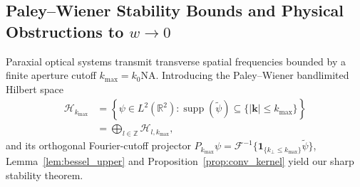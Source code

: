 \documentclass[aps,pra,onecolumn,notitlepage,11pt,tightenlines,nofootinbib,floatfix,longbibliography]{revtex4-2}
\theoremstyle{remark}
\newcommand{\abs}[1]{\lvert #1 \rvert}
\begin{document}
\subsection{Paley--Wiener Stability Bounds and Physical Obstructions to \texorpdfstring{$w \to 0$}{w -> 0}}
\label{subsec:paley_wiener}

Paraxial optical systems transmit transverse spatial frequencies bounded by a finite aperture cutoff $k_{\max} = k_0 \mathrm{NA}$. Introducing the Paley--Wiener bandlimited Hilbert space
\begin{align}
\mathcal{H}_{k_{\max}} &= \left\{\psi \in L^2(\mathbb{R}^2) : \operatorname{supp}(\widetilde{\psi}) \subseteq \{\abs{\mathbf{k}} \le k_{\max}\}\right\} \nonumber \\
&= \bigoplus_{l\in\mathbb{Z}} \mathcal{H}_{l,k_{\max}},
\label{eq:paley_wiener}
\end{align}
and its orthogonal Fourier-cutoff projector $P_{k_{\max}}\psi = \mathcal{F}^{-1}\{\mathbf{1}_{\{k_\perp \le k_{\max}\}}\widetilde{\psi}\}$, Lemma~\ref{lem:bessel_upper} and Proposition~\ref{prop:conv_kernel} yield our sharp stability theorem.
\end{document}
